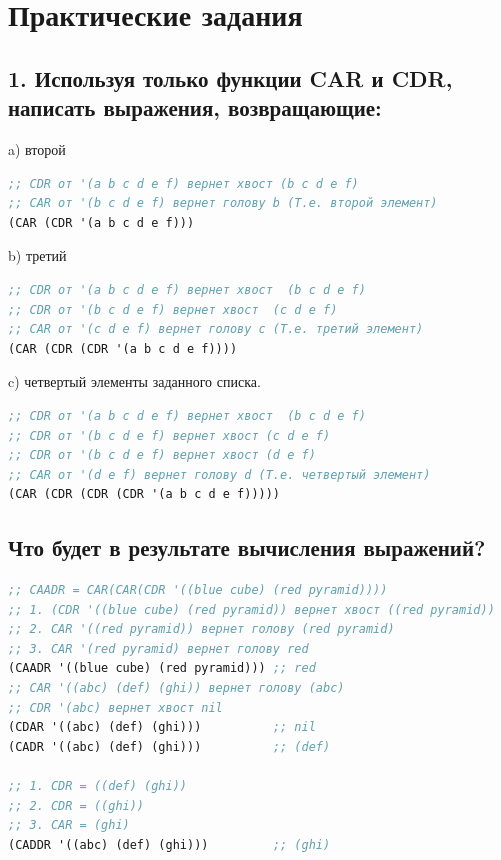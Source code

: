 \chapter{Практические задания}

\section{1. Используя только функции CAR и CDR,
написать выражения, возвращающие:}

a) второй
\begin{lstlisting}[language=Lisp]
;; CDR от '(a b c d e f) вернет хвост (b c d e f)
;; СAR от '(b c d e f) вернет голову b (Т.е. второй элемент)
(CAR (CDR '(a b c d e f)))
\end{lstlisting}

b) третий
\begin{lstlisting}[language=Lisp]
;; CDR от '(a b c d e f) вернет хвост  (b c d e f)
;; CDR от '(b c d e f) вернет хвост  (c d e f)
;; СAR от '(c d e f) вернет голову с (Т.е. третий элемент)
(CAR (CDR (CDR '(a b c d e f))))
\end{lstlisting}

c) четвертый элементы заданного списка.
\begin{lstlisting}[language=Lisp]
;; CDR от '(a b c d e f) вернет хвост  (b c d e f)
;; CDR от '(b c d e f) вернет хвост (c d e f)
;; CDR от '(b c d e f) вернет хвост (d e f)
;; СAR от '(d e f) вернет голову d (Т.е. четвертый элемент)
(CAR (CDR (CDR (CDR '(a b c d e f)))))
\end{lstlisting}

\section{Что будет в результате вычисления выражений?}

\begin{lstlisting}[language=Lisp]
;; CAADR = CAR(CAR(CDR '((blue cube) (red pyramid))))
;; 1. (CDR '((blue cube) (red pyramid)) вернет хвост ((red pyramid))
;; 2. CAR '((red pyramid)) вернет голову (red pyramid)
;; 3. CAR '(red pyramid) вернет голову red 
(CAADR '((blue cube) (red pyramid))) ;; red
;; CAR '((abc) (def) (ghi)) вернет голову (abc)
;; CDR '(abc) вернет хвост nil
(CDAR '((abc) (def) (ghi)))			 ;; nil
(CADR '((abc) (def) (ghi)))			 ;; (def)

;; 1. CDR = ((def) (ghi))
;; 2. CDR = ((ghi))
;; 3. CAR = (ghi)
(CADDR '((abc) (def) (ghi)))		 ;; (ghi)
\end{lstlisting}


